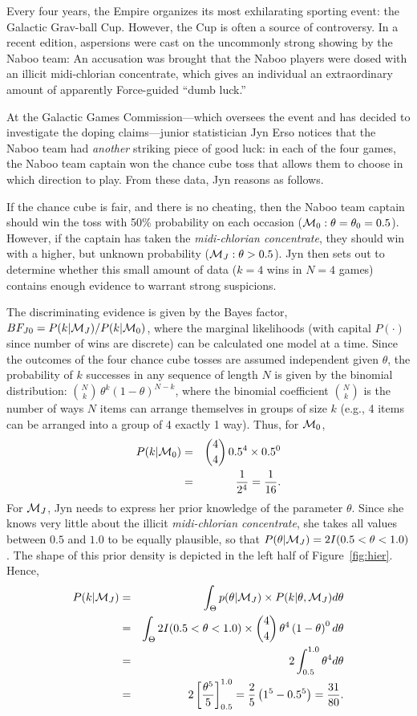 \label{ex:prior}
Every four years, the Empire organizes its most exhilarating sporting event: the Galactic Grav-ball Cup. However, the Cup is often a source of controversy. In a recent edition, aspersions were cast on the uncommonly strong showing by the Naboo team: An accusation was brought that the Naboo players were dosed with an illicit midi-chlorian concentrate, which gives an individual an extraordinary amount of apparently Force-guided ``dumb luck.''

At the Galactic Games Commission---which oversees the event and has decided to investigate the doping claims---junior statistician Jyn Erso notices that the Naboo team had \emph{another} striking piece of good luck: in each of the four games, the Naboo team captain won the chance cube toss that allows them to choose in which direction to play. From these data, Jyn reasons as follows.

If the chance cube is fair, and there is no cheating, then the Naboo team captain should win the toss with 50\% probability on each occasion (${\cal M}_0: \theta =\theta_0= 0.5$). However, if the captain has taken the \textit{midi-chlorian concentrate}, they should win with a higher, but unknown probability (${\cal M}_J: \theta > 0.5$). Jyn then sets out to determine whether this small amount of data ($k=4$ wins in $N=4$ games) contains enough evidence to warrant strong suspicions.

The discriminating evidence is given by the Bayes factor, $BF_{J0}=P(k|{\cal M}_J)/P(k|{\cal M}_0)$, where the marginal likelihoods (with capital $P(\cdot)$ since number of wins are discrete) can be calculated one model at a time. Since the outcomes of the four chance cube tosses are assumed independent given $\theta$, the probability of $k$ successes in any sequence of length $N$ is given by the binomial distribution: $\binom{N}{k}\,\theta^k(1-\theta)^{N-k}$, where the binomial coefficient $\binom{N}{k}$ is the number of ways $N$ items can arrange themselves in groups of size $k$ (e.g., 4 items can be arranged into a group of 4 exactly 1 way). Thus, for ${\cal M}_0$,
\begin{eqnarray*}
 P(k|{\cal M}_0) &=& \binom{4}{4}\, 0.5^4 \times 0.5^0\\
           &=& \frac{1}{2^{4}} = \frac{1}{16}.
\end{eqnarray*}
For ${\cal M}_J$, Jyn needs to express her prior knowledge of the parameter $\theta$. Since she knows very little about the illicit \emph{midi-chlorian concentrate}, she takes all values between $0.5$ and $1.0$ to be equally plausible, so that $P(\theta|{\cal M}_J) = 2 I(0.5<\theta<1.0)$. The shape of this prior density is depicted in the left half of Figure~\ref{fig:hier}. Hence,
\begin{eqnarray*}
  P(k|{\cal M}_J) &=& \int_{\Theta} p(\theta|{\cal M}_J) \times P(k|\theta,{\cal M}_J) d \theta\\
            &=& \int_{\Theta} 2I(0.5<\theta<1.0) \times \binom{4}{4}\, \theta^4 \left(1-\theta\right)^0 d \theta \\
            &=& 2\int_{0.5}^{1.0} \theta^4 d \theta \\
            &=& 2\left[\frac{\theta^5}{5} \right]_{0.5}^{1.0} = \frac{2}{5} \left( 1^5 - 0.5^{5} \right) = \frac{31}{80}.
\end{eqnarray*}

